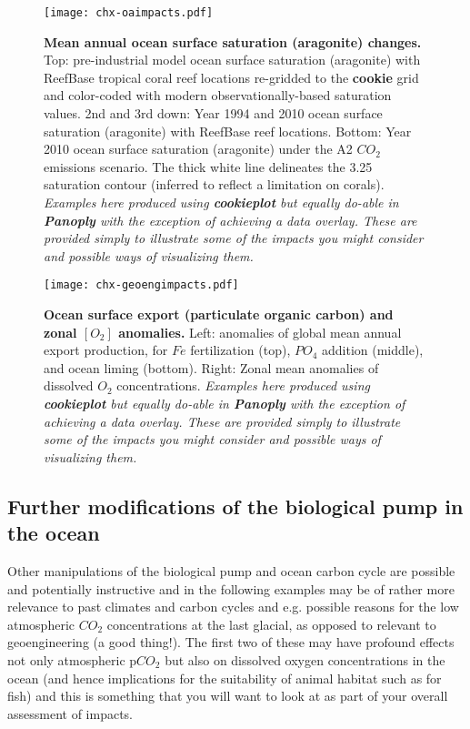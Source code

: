 \begin{figure}[ht]
\begin{center}
\texttt{[image: chx-oaimpacts.pdf]}
\end{center}
\caption{
\textbf{Mean annual ocean surface saturation (aragonite) changes.}
Top: pre-industrial model ocean surface saturation (aragonite) with ReefBase tropical coral reef locations re-gridded to the \textbf{cookie} grid and color-coded with modern observationally-based saturation values.
2nd and 3rd down: Year 1994 and 2010 ocean surface saturation (aragonite) with ReefBase reef locations.
Bottom: Year 2010 ocean surface saturation (aragonite) under the A2 \(CO_{2}\) emissions scenario.
The thick white line delineates the 3.25 saturation contour (inferred to reflect a limitation on corals).
\textit{Examples here produced using \textbf{cookieplot} but equally do-able in \textbf{Panoply} with the exception of achieving a data overlay. These are provided simply to illustrate some of the impacts you might consider and possible ways of visualizing them.}
}
\label{fig:chx-oaimpacts}
\end{figure}

\begin{figure}[ht]
\begin{center}
\texttt{[image: chx-geoengimpacts.pdf]}
\end{center}
\caption{
\textbf{Ocean surface export (particulate organic carbon) and zonal \([O_{2}]\) anomalies.}
Left: anomalies of global mean annual export production, for \(Fe\) fertilization (top), \(PO_{4}\) addition (middle), and ocean liming (bottom).
Right: Zonal mean anomalies of dissolved \(O_{2}\) concentrations.
\textit{Examples here produced using \textbf{cookieplot} but equally do-able in \textbf{Panoply} with the exception of achieving a data overlay. These are provided simply to illustrate some of the impacts you might consider and possible ways of visualizing them.}
}
\label{fig:chx-geoengimpacts}
\end{figure}

\newpage 

\subsection{Further modifications of the biological pump in the ocean}

Other manipulations of the biological pump and ocean carbon cycle are possible and potentially instructive and in the following examples may be of rather more relevance to past climates and carbon cycles and e.g. possible reasons for the low atmospheric \(CO_{2}\) concentrations at the last glacial, as opposed to relevant to geoengineering (a good thing!). The first two of these may have profound effects not only atmospheric p\(CO_{2}\) but also on dissolved oxygen concentrations in the ocean (and hence implications for the suitability of animal habitat such as for fish) and this is something that you will want to look at as part of your overall assessment of impacts.

